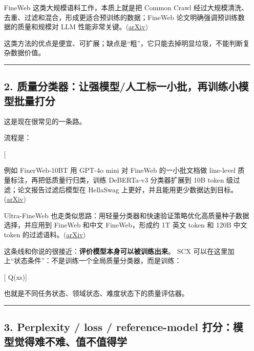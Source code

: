\documentclass[
  12pt,
]{ctexart}
\begin{document}
FineWeb 这类大规模语料工作，本质上就是把 Common Crawl
经过大规模清洗、去重、过滤和混合，形成更适合预训练的数据；FineWeb
论文明确强调预训练数据的质量和规模对 LLM
性能非常关键。(\href{https://arxiv.org/html/2406.17557v1?utm_source=chatgpt.com}{arXiv})

这类方法的优点是便宜、可扩展；缺点是``粗''，它只能去掉明显垃圾，不能判断复杂数据价值。

\begin{center}\rule{0.5\linewidth}{0.5pt}\end{center}

\subsection{2.
质量分类器：让强模型/人工标一小批，再训练小模型批量打分}\label{ux8d28ux91cfux5206ux7c7bux5668ux8ba9ux5f3aux6a21ux578bux4ebaux5de5ux6807ux4e00ux5c0fux6279ux518dux8badux7ec3ux5c0fux6a21ux578bux6279ux91cfux6253ux5206}

这是现在很常见的一条路。

流程是：

{[}  \rightarrow {}
\rightarrow {} \rightarrow \text{批量过滤}{]}

例如 FinerWeb-10BT 用 GPT-4o mini 对 FineWeb 的一小批文档做 line-level
质量标注，再把低质量行归类，训练 DeBERTa-v3 分类器扩展到 10B token
级过滤；论文报告过滤后模型在 HellaSwag
上更好，并且能用更少数据达到目标。(\href{https://arxiv.org/abs/2501.07314?utm_source=chatgpt.com}{arXiv})

Ultra-FineWeb
也走类似思路：用轻量分类器和快速验证策略优化高质量种子数据选择，并应用到
FineWeb 和中文 FineWeb，形成约 1T 英文 token 和 120B 中文 token
的过滤语料。(\href{https://arxiv.org/abs/2505.05427?utm_source=chatgpt.com}{arXiv})

这条线和你说的很接近：\textbf{评价模型本身可以被训练出来}。 SCX
可以在这里加上``状态条件''：不是训练一个全局质量分类器，而是训练：

{[} Q(x\mid s){]}

也就是不同任务状态、领域状态、难度状态下的质量评估器。

\begin{center}\rule{0.5\linewidth}{0.5pt}\end{center}

\subsection{3. Perplexity / loss / reference-model
打分：模型觉得难不难、值不值得学}\label{perplexity-loss-reference-model-ux6253ux5206ux6a21ux578bux89c9ux5f97ux96beux4e0dux96beux503cux4e0dux503cux5f97ux5b66}
\end{document}
